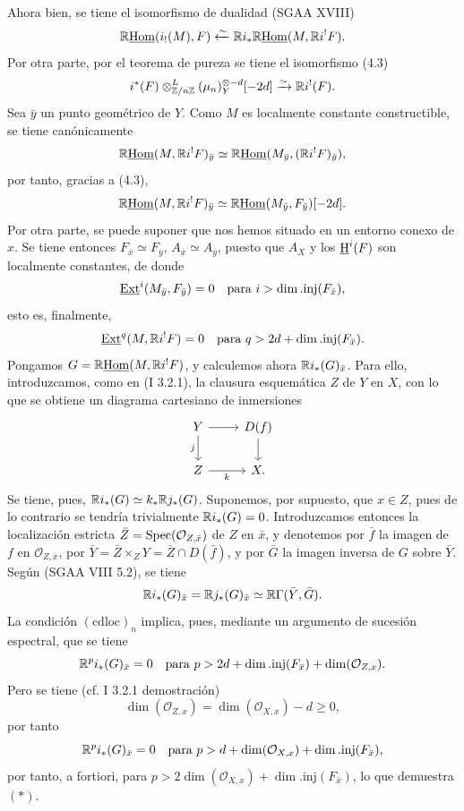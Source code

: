 Ahora bien, se tiene el isomorfismo de dualidad (SGAA XVIII)
\[
        \mathbb{R}\underline{\operatorname{Hom}}(i_!(M),F)\xleftarrow{\sim} \mathbb{R} i_*\mathbb{R}\underline{\operatorname{Hom}}(M,\mathbb{R} i^!F).
\]
Por otra parte, por el teorema de pureza se tiene el isomorfismo (4.3)
\[
        i^*(F)\otimes^L_{\mathbb{Z}/n\mathbb{Z}}(\mu_n)_Y^{\otimes -d}[-2d]\xrightarrow{\sim}\mathbb{R} i^!(F).
\]
Sea $\bar{y}$ un punto geométrico de $Y$. Como $M$ es localmente constante constructible, se tiene canónicamente
\[
        \mathbb{R}\underline{\operatorname{Hom}}(M,\mathbb{R} i^!F)_{\bar{y}}\simeq \mathbb{R}\underline{\operatorname{Hom}}(M_{\bar{y}},(\mathbb{R} i^!F)_{\bar{y}}),
\]
por tanto, gracias a (4.3),
\[
        \mathbb{R}\underline{\operatorname{Hom}}(M,\mathbb{R} i^!F)_{\bar{y}}\simeq \mathbb{R}\underline{\operatorname{Hom}}(M_{\bar{y}},F_{\bar{y}})[-2d].
\]
Por otra parte, se puede suponer que nos hemos situado en un entorno conexo de $x$. Se tiene entonces $F_{\bar{x}}\simeq F_{\bar{y}}$, $A_{\bar{x}}\simeq A_{\bar{y}}$, puesto que $A_X$ y los $\underline{\mathrm H}^i(F)$ son localmente constantes, de donde
\[
        \underline{\operatorname{Ext}}^i(M_{\bar{y}},F_{\bar{y}})=0\quad\hbox{para }i>\dim.\mathrm{inj}(F_{\bar{x}}),
\]
esto es, finalmente,
\[
        \underline{\operatorname{Ext}}^{q}(M,\mathbb{R} i^!F)=0\quad\hbox{para }q>2d+\dim.\mathrm{inj}(F_{\bar{x}}).
\]
Pongamos $G=\mathbb{R}\underline{\operatorname{Hom}}(M,\mathbb{R} i^!F)$, y calculemos ahora $\mathbb{R} i_*(G)_{\bar{x}}$. Para ello, introduzcamos, como en (I 3.2.1), la clausura esquemática $Z$ de $Y$ en $X$, con lo que se obtiene un diagrama cartesiano de inmersiones
\[
\begin{tikzcd}
Y \arrow[r] \arrow[d,"j"'] & D(f) \arrow[d]\\
Z \arrow[r,"k"'] & X.
\end{tikzcd}
\]
Se tiene, pues, $\mathbb{R} i_*(G)\simeq k_*\mathbb{R} j_*(G)$. Suponemos, por supuesto, que $x\in Z$, pues de lo contrario se tendría trivialmente $\mathbb{R} i_*(G)=0$. Introduzcamos entonces la localización estricta $\bar{Z}=\operatorname{Spec}(\mathcal{O}_{Z,\bar{x}})$ de $Z$ en $\bar{x}$, y denotemos por $\bar{f}$ la imagen de $f$ en $\mathcal{O}_{Z,\bar{x}}$, por $\bar{Y}=\bar{Z}\times_ZY=\bar{Z}\cap D(\bar{f})$, y por $\bar{G}$ la imagen inversa de $G$ sobre $\bar{Y}$. Según (SGAA VIII 5.2), se tiene
\[
        \mathbb{R} i_*(G)_{\bar{x}}=\mathbb{R} j_*(G)_{\bar{x}}\simeq \mathbb{R}\Gamma(\bar{Y},\bar{G}).
\]
La condición $(\mathrm{cdloc})_n$ implica, pues, mediante un argumento de sucesión espectral, que se tiene
\[
        \mathbb{R}^p i_*(G)_{\bar{x}}=0\quad\hbox{para }p>2d+\dim.\mathrm{inj}(F_{\bar{x}})+\dim(\mathcal{O}_{Z,x}).
\]
Pero se tiene (cf. I 3.2.1 demostración)
\[
        \dim(\mathcal{O}_{Z,x})=\dim(\mathcal{O}_{X,x})-d\geq0,
\]
por tanto
\[
        \mathbb{R}^p i_*(G)_{\bar{x}}=0\quad\hbox{para }p>d+\dim(\mathcal{O}_{X,x})+\dim.\mathrm{inj}(F_{\bar{x}}),
\]
por tanto, a fortiori, para $p>2\dim(\mathcal{O}_{X,x})+\dim.\mathrm{inj}(F_{\bar{x}})$, lo que demuestra $(*)$.

